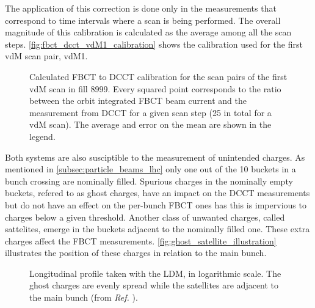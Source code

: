 The application of this correction is done only in the measurements that correspond to time intervals where a scan is being performed. The overall magnitude of this calibration is calculated as the average among all the scan steps. \autoref{fig:fbct_dcct_vdM1_calibration} shows the calibration used for the first vdM scan pair, vdM1.

\begin{figure}[!htb]
	\centering
	\caption[FBCT calibration for scan pairs]{Calculated FBCT to DCCT calibration for the scan pairs of the first vdM scan in fill 8999. Every squared point corresponds to the ratio between the orbit integrated FBCT beam current and the measurement from DCCT for a given scan step (25 in total for a vdM scan). The average and error on the mean are shown in the legend.}
	\label{fig:fbct_dcct_vdM1_calibration}
\end{figure}

Both systems are also susciptible to the measurement of unintended charges. As mentioned in \autoref{subsec:particle_beams_lhc} only one out of the 10 buckets in a bunch crossing are nominally filled. Spurious charges in the nominally empty buckets, refered to as ghost charges, have an impact on the DCCT measurements but do not have an effect on the per-bunch FBCT ones has this is impervious to charges below a given threshold. Another class of unwanted charges, called sattelites, emerge in the buckets adjacent to the nominally filled one. These extra charges affect the FBCT measurements. \autoref{fig:ghost_satellite_illustration} illustrates the position of these charges in relation to the main bunch. 

\begin{figure}[!htb]
	\centering
	\caption[Longitudinal bunch profile with LDM]{Longitudinal profile taken with the LDM, in logarithmic scale. The ghost charges are evenly spread while the satellites are adjacent to the main bunch (from \textit{Ref.} \cite{Alici:1427728}).}
	\label{fig:ghost_satellite_illustration}
\end{figure}

